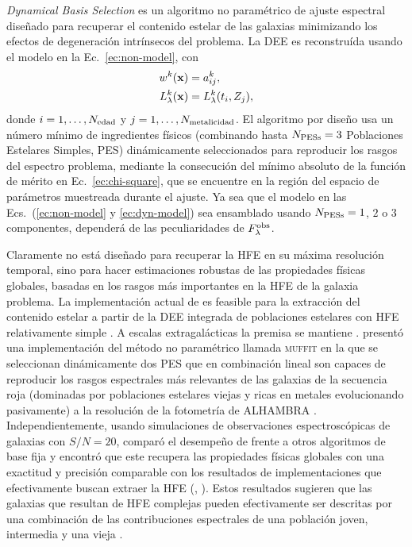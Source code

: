 \emph{Dynamical Basis Selection} \citep[\dynbas;][]{Mateu2009, Mateu2010, Magris2015} es un
algoritmo no paramétrico de ajuste espectral diseñado para recuperar el contenido estelar de las
galaxias minimizando los efectos de degeneración intrínsecos del problema. La DEE es reconstruída
usando el modelo en la Ec.~\eqref{ec:non-model}, con
%
\begin{subequations}\label{ec:dyn-model}
\begin{align}
w^k(\hip) &= a_{ij}^k, \\
\sedi{k}(\hip) &= \sedi{k}(t_i, Z_j),
\end{align}
\end{subequations}
%
donde $i=1,\ldots,\Nt{edad}$ y $j=1,\ldots,\Nt{metalicidad}$. El algoritmo \dynbas por diseño usa un
número mínimo de ingredientes físicos (combinando hasta $\Nt{PESs}=3$ Poblaciones Estelares Simples,
PES) dinámicamente seleccionados para reproducir los rasgos del espectro problema, mediante la
consecución del mínimo absoluto de la función de mérito en Ec.~\eqref{ec:chi-square}, que se
encuentre en la región del espacio de parámetros muestreada durante el ajuste. Ya sea que el modelo
en las Ecs.~(\ref{ec:non-model} y \ref{ec:dyn-model}) sea ensamblado usando $\Nt{PESs}=1$, $2$ o $3$
componentes, dependerá de las peculiaridades de $\sedt[F]{obs}$.

Claramente \dynbas no está diseñado para recuperar la HFE en su máxima resolución temporal, sino
para hacer estimaciones robustas de las propiedades físicas globales, basadas en los rasgos más
importantes en la HFE de la galaxia problema. La implementación actual de \dynbas es feasible para
la extracción del contenido estelar a partir de la DEE integrada de poblaciones estelares con HFE
relativamente simple \citep{Cabrera-Ziri2016}. A escalas extragalácticas la premisa se mantiene
\citep[\eg,][]{Diaz2015, Mejia-Narvaez2017}. \citet{Diaz2015} presentó una implementación del método
no paramétrico llamada \textsc{muffit} en la que se seleccionan dinámicamente dos PES que en
combinación lineal son capaces de reproducir los rasgos espectrales más relevantes de las galaxias
de la secuencia roja (dominadas por poblaciones estelares viejas y ricas en metales evolucionando
pasivamente) a la resolución de la fotometría de ALHAMBRA \citep{Moles2008}. Independientemente,
usando simulaciones de observaciones espectroscópicas de galaxias con $S/N=20$, \citet{Magris2015}
comparó el desempeño de \dynbas frente a otros algoritmos de base fija y encontró que este recupera
las propiedades físicas globales con una exactitud y precisión comparable con los resultados de
implementaciones que efectivamente buscan extraer la HFE (\eg, \starlight). Estos resultados
sugieren que las galaxias que resultan de HFE complejas pueden efectivamente ser descritas por una
combinación de las contribuciones espectrales de una población joven, intermedia y una vieja
\citep{CidFernandes2005}.

